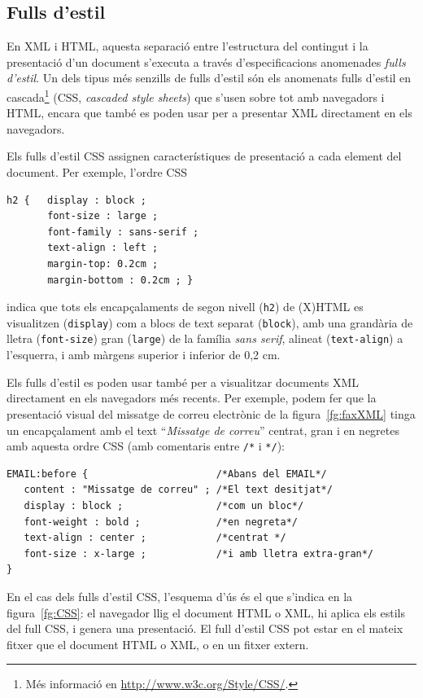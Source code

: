 \subsection{Fulls d'estil}
En XML i HTML, aquesta separació entre l'estructura del contingut i la
presentació d'un document s'executa a través d'especificacions
anomenades \emph{fulls d'estil}. Un dels tipus més senzills de fulls
d'estil són els anomenats fulls d'estil en cascada\footnote{Més
  informació en \url{http://www.w3c.org/Style/CSS/}.} (CSS,
\emph{cascaded style sheets}) que s'usen sobre tot amb navegadors i
HTML, encara que també es poden usar per a presentar XML directament
en els navegadors.

Els fulls d'estil CSS assignen característiques de presentació a cada
element del document. Per exemple, l'ordre CSS
\begin{verbatim}
h2 {   display : block ;
       font-size : large ;
       font-family : sans-serif ;
       text-align : left ;
       margin-top: 0.2cm ;
       margin-bottom : 0.2cm ; }
\end{verbatim}
indica que tots els encapçalaments de segon nivell (\texttt{h2}) de
(X)HTML es visualitzen (\texttt{display}) com a blocs de text separat
(\texttt{block}), amb una grandària de lletra (\texttt{font-size})
gran (\texttt{large}) de la família \emph{sans serif}, alineat
(\texttt{text-align}) a l'esquerra, i amb màrgens superior i inferior
de 0,2 cm.

Els fulls d'estil es poden usar també per a visualitzar documents XML
directament en els navegadors més recents. Per exemple, podem fer que
la presentació visual del missatge de correu electrònic de la
figura~\ref{fg:faxXML} tinga un encapçalament amb el text
``\emph{Missatge de correu}'' centrat, gran i en negretes amb aquesta
ordre CSS (amb comentaris entre \texttt{/*} i \texttt{*/}):
\begin{verbatim}
EMAIL:before {                      /*Abans del EMAIL*/
   content : "Missatge de correu" ; /*El text desitjat*/
   display : block ;                /*com un bloc*/
   font-weight : bold ;             /*en negreta*/
   text-align : center ;            /*centrat */
   font-size : x-large ;            /*i amb lletra extra-gran*/
}
\end{verbatim}

En el cas dels fulls d'estil CSS, l'esquema d'ús és el que s'indica en
la figura~\ref{fg:CSS}: el navegador llig el document HTML o XML, hi
aplica els estils del full CSS, i genera una presentació. El full
d'estil CSS pot estar en el mateix fitxer que el document HTML o XML,
o en un fitxer extern.

